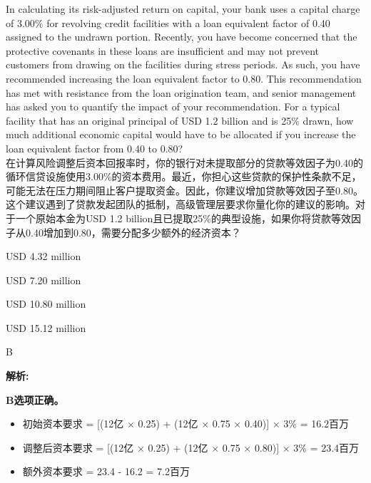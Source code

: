 \documentclass{article}
\newcounter{question} %
\newenvironment{explanation}
{\textbf{解析:}\par}
{\par}
\begin{document}
\begin{question}
    In calculating its risk-adjusted return on capital, your bank uses a capital charge of 3.00\% for revolving credit facilities with a loan equivalent factor of 0.40 assigned to the undrawn portion. Recently, you have become concerned that the protective covenants in these loans are insufficient and may not prevent customers from drawing on the facilities during stress periods. As such, you have recommended increasing the loan equivalent factor to 0.80. This recommendation has met with resistance from the loan origination team, and senior management has asked you to quantify the impact of your recommendation. For a typical facility that has an original principal of USD 1.2 billion and is 25\% drawn, how much additional economic capital would have to be allocated if you increase the loan equivalent factor from 0.40 to 0.80?\\
    在计算风险调整后资本回报率时，你的银行对未提取部分的贷款等效因子为0.40的循环信贷设施使用3.00\%的资本费用。最近，你担心这些贷款的保护性条款不足，可能无法在压力期间阻止客户提取资金。因此，你建议增加贷款等效因子至0.80。这个建议遇到了贷款发起团队的抵制，高级管理层要求你量化你的建议的影响。对于一个原始本金为USD 1.2 billion且已提取25\%的典型设施，如果你将贷款等效因子从0.40增加到0.80，需要分配多少额外的经济资本？
\end{question}

\begin{choices}
    \item USD 4.32 million
    \item USD 7.20 million
    \item USD 10.80 million
    \item USD 15.12 million
\end{choices}

\begin{correctanswer}
    B
\end{correctanswer}

\begin{explanation}
   

    \textbf{B选项正确。}
    \begin{itemize}
        \item 初始资本要求 = [(12亿 × 0.25) + (12亿 × 0.75 × 0.40)] × 3\% = 16.2百万
        \item 调整后资本要求 = [(12亿 × 0.25) + (12亿 × 0.75 × 0.80)] × 3\% = 23.4百万
        \item 额外资本要求 = 23.4 - 16.2 = 7.2百万
    \end{itemize}

\end{explanation}
\end{document}
